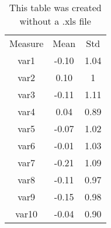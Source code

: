 \begin{table}[h]
\caption{This table was created without a .xls file}
\begin{center} \small
\begin{tabular}{ccc}
\hline 

Measure & Mean & Std \\

var1 & -0.10 & 1.04 \\

var2 & 0.10 & 1 \\

var3 & -0.11 & 1.11 \\

var4 & 0.04 & 0.89 \\

var5 & -0.07 & 1.02 \\

var6 & -0.01 & 1.03 \\

var7 & -0.21 & 1.09 \\

var8 & -0.11 & 0.97 \\

var9 & -0.15 & 0.98 \\

var10 & -0.04 & 0.90 \\

\hline 
\end{tabular}
\end{center}
\end{table}